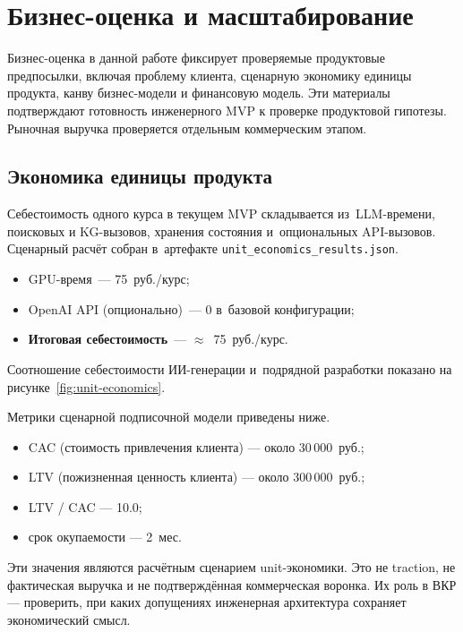 \section{Бизнес-оценка и масштабирование}

Бизнес-оценка в данной работе фиксирует проверяемые продуктовые
предпосылки, включая проблему клиента,
сценарную экономику единицы продукта, канву бизнес-модели и финансовую
модель. Эти материалы подтверждают готовность инженерного MVP к проверке
продуктовой гипотезы. Рыночная выручка проверяется отдельным коммерческим этапом.

\subsection{Экономика единицы продукта}

Себестоимость одного курса в текущем MVP складывается из~LLM-времени,
поисковых и KG-вызовов, хранения состояния и~опциональных API-вызовов.
Сценарный расчёт собран в~артефакте \texttt{unit\_economics\_results.json}.

\begin{itemize}
  \item GPU-время~— 75~руб./курс;
  \item OpenAI API (опционально)~— 0 в~базовой конфигурации;
  \item \textbf{Итоговая себестоимость}~— $\approx$~75~руб./курс.
\end{itemize}

Соотношение себестоимости ИИ-генерации и~подрядной разработки показано на рисунке~\ref{fig:unit-economics}.



Метрики сценарной подписочной модели приведены ниже.

\begin{itemize}
  \item CAC (стоимость привлечения клиента) — около 30\,000~руб.;
  \item LTV (пожизненная ценность клиента) — около 300\,000~руб.;
  \item LTV / CAC — 10.0;
  \item срок окупаемости — 2~мес.
\end{itemize}

Эти значения являются расчётным сценарием unit-экономики. Это не traction,
не фактическая выручка и не подтверждённая коммерческая воронка. Их роль
в ВКР — проверить, при каких допущениях инженерная архитектура сохраняет
экономический смысл.

